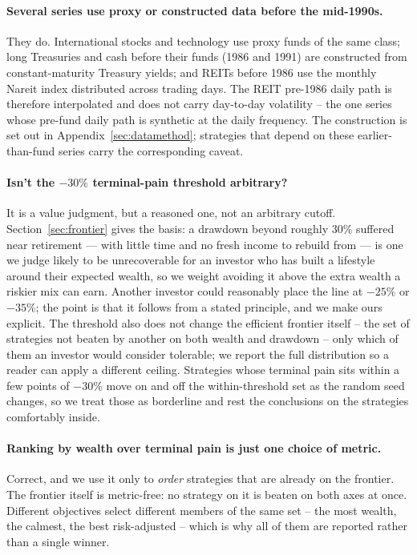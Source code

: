 \documentclass[11pt]{article}
\begin{document}
\paragraph{Several series use proxy or constructed data before the mid-1990s.} They do. International
stocks and technology use proxy funds of the same class; long Treasuries and cash before their funds
(1986 and 1991) are constructed from constant-maturity Treasury yields; and REITs before 1986 use the
monthly Nareit index distributed across trading days. The REIT pre-1986 daily path is therefore
interpolated and does not carry day-to-day volatility -- the one series whose pre-fund daily path is
synthetic at the daily frequency. The construction is set out in Appendix~\ref{sec:datamethod}; strategies
that depend on these earlier-than-fund series carry the corresponding caveat.

\paragraph{Isn't the $-30\%$ terminal-pain threshold arbitrary?} It is a value judgment, but a reasoned
one, not an arbitrary cutoff. Section~\ref{sec:frontier} gives the basis: a drawdown beyond roughly
$30\%$ suffered near retirement --- with little time and no fresh income to rebuild from --- is one we
judge likely to be unrecoverable for an investor who has built a lifestyle around their expected wealth,
so we weight avoiding it above the extra wealth a riskier mix can earn. Another investor could
reasonably place the line at $-25\%$ or $-35\%$; the point is that it follows from a stated principle,
and we make ours explicit. The threshold also does not change the efficient frontier itself -- the set
of strategies not beaten by another on both wealth and drawdown -- only which of them an investor would
consider tolerable; we report the full distribution so a reader can apply a different ceiling.
Strategies whose terminal pain sits within a few points of $-30\%$ move on and off the within-threshold
set as the random seed changes, so we treat those as borderline and rest the conclusions on the
strategies comfortably inside.

\paragraph{Ranking by wealth over terminal pain is just one choice of metric.} Correct, and we use it
only to \emph{order} strategies that are already on the frontier. The frontier itself is metric-free:
no strategy on it is beaten on both axes at once. Different objectives select different members of the
same set -- the most wealth, the calmest, the best risk-adjusted -- which is why all of them are
reported rather than a single winner.
\end{document}
